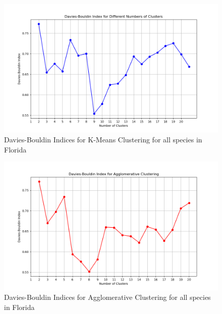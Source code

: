 \documentclass{article}
\begin{document}
\begin{figure}[H]
    \centering
    \begin{minipage}{0.9\textwidth}
        \centering
        \includegraphics[width=\textwidth]{figures/kmeandbi.png}
        \caption{Davies-Bouldin Indices for K-Means Clustering for all species in Florida}
        \label{fig:kmeansdbi}
    \end{minipage}
\end{figure}

\begin{figure}[H]
    \centering
    \begin{minipage}{0.9\textwidth}
        \centering
        \includegraphics[width=\textwidth]{figures/aggdbi.png}
        \caption{Davies-Bouldin Indices for Agglomerative Clustering for all species in Florida}
        \label{fig:aggdbi}
    \end{minipage}
\end{figure}
\end{document}
